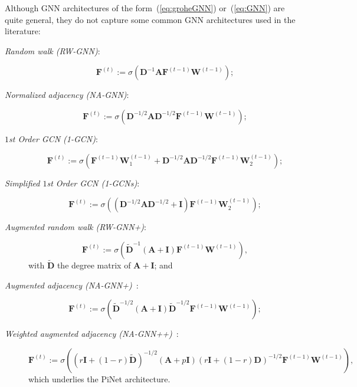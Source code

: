 Although GNN architectures of the form~(\ref{eq:groheGNN}) or~(\ref{eq:GNN}) are quite general,  they do not capture some common GNN architectures used in the literature:
%
\begin{description}
\item[\textit{Random walk (RW-GNN)}:] 
$$
\mathbf{F}^{(t)}:=\sigma\left(\mathbf{D}^{-1}\mathbf{A}\mathbf{F}^{(t-1)}\mathbf{W}^{(t-1)}\right);$$
\item[\textit{Normalized adjacency (NA-GNN)}:] 
$$
\mathbf{F}^{(t)}:=\sigma\left(\mathbf{D}^{-1/2}\mathbf{A}\mathbf{D}^{-1/2}\mathbf{F}^{(t-1)}\mathbf{W}^{(t-1)}\right)
;$$
\item[\textit{$1$st Order GCN (1-GCN)}:]
$$
\mathbf{F}^{(t)}:=\sigma\left(\mathbf{F}^{(t-1)}\mathbf{W}_1^{(t-1)}+\mathbf{D}^{-1/2}\mathbf{A}\mathbf{D}^{-1/2}\mathbf{F}^{(t-1)}\mathbf{W}_2^{(t-1)}\right);$$

\item[\textit{Simplified $1$st Order GCN (1-GCNs)}:]
$$
\mathbf{F}^{(t)}:=\sigma\left((\mathbf{D}^{-1/2}\mathbf{A}\mathbf{D}^{-1/2}+\mathbf{I})\mathbf{F}^{(t-1)}\mathbf{W}_2^{(t-1)}\right);$$
\item[\textit{Augmented random walk (RW-GNN+)}:] 
$$
\mathbf{F}^{(t)}:=\sigma\left(\tilde{\mathbf{D}}^{-1}(\mathbf{A}+\mathbf{I})\mathbf{F}^{(t-1)}\mathbf{W}^{(t-1)}\right),$$
with $\tilde{\mathbf{D}}$ the degree matrix of $\mathbf{A}+\mathbf{I}$; and
\item[\textit{Augmented adjacency (NA-GNN+)}~\cite{kipf-loose}:] %
$$
\mathbf{F}^{(t)}:=\sigma\left(\tilde{\mathbf{D}}^{-1/2}(\mathbf{A}+\mathbf{I})\tilde{\mathbf{D}}^{-1/2}\mathbf{F}^{(t-1)}\mathbf{W}^{(t-1)}\right);
$$
\item[\textit{Weighted augmented adjacency (NA-GNN++)}~\cite{DBLP:journals/corr/abs-1905-03046}:]
$$\mathbf{F}^{(t)}:=\sigma\left((r\mathbf{I}+(1-r)\tilde{\mathbf{D}})^{-1/2}(\mathbf{A}+p\mathbf{I})(r\mathbf{I}+(1-r)\mathbf{D})^{-1/2}\mathbf{F}^{(t-1)}\mathbf{W}^{(t-1)}\right),
$$
which underlies the PiNet architecture.
\end{description}
